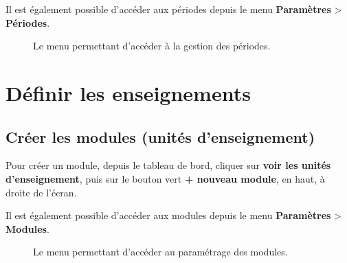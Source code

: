\documentclass[letterpaper,10pt,french]{sphinxmanual}
\begin{document}
Il est également possible d'accéder aux périodes depuis le menu \textbf{Paramètres} \textgreater{} \textbf{Périodes}.
\begin{figure}[htbp]
\centering
\capstart

\caption{Le menu permettant d'accéder à la gestion des périodes.}\end{figure}


\section{Définir les enseignements}
\label{admin:definir-les-enseignements}

\subsection{Créer les modules (unités d'enseignement)}
\label{admin:creer-les-modules-unites-d-enseignement}
Pour créer un module, depuis le tableau de bord, cliquer sur \textbf{voir les unités d'enseignement}, puis sur le bouton vert \textbf{+ nouveau module}, en haut, à droite de l'écran.

Il est également possible d'accéder aux modules depuis le menu \textbf{Paramètres} \textgreater{} \textbf{Modules}.
\begin{figure}[htbp]
\centering
\capstart

\caption{Le menu permettant d'accéder au paramétrage des modules.}\end{figure}
\end{document}

